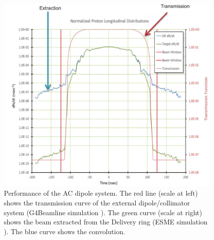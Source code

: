 \documentclass[12pt,a4paper,openright, oneside, titlepage]{book} %
\begin{document}
\begin{figure}[h!]
\centering
\includegraphics[scale=0.3]{Extinction}
\caption[AC dipole extinction performance]{Performance of the AC dipole system\cite{bob_mu2e}. The red line (scale at left) shows the transmission curve of the external dipole/collimator system (G4Beamline simulation \cite{G4beamline}). 
The green curve (scale at right) shows the beam extracted from the Delivery ring (ESME simulation \cite{ESME}). The blue curve shows the convolution.}
\label{_Extinction}
\end{figure}
\end{document}
